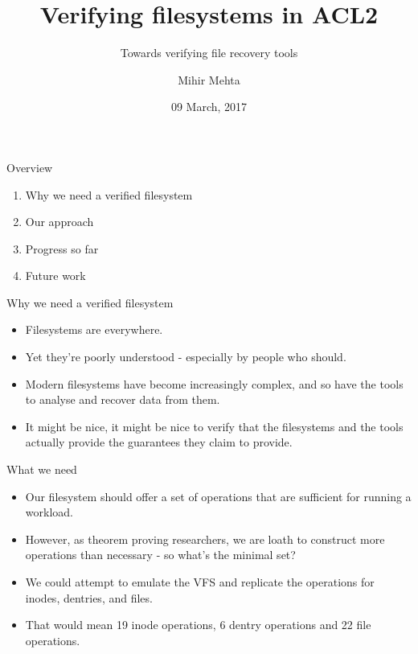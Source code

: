 \documentclass{beamer}
\title{Verifying filesystems in ACL2}
\subtitle{Towards verifying file recovery tools}
\author{Mihir Mehta}
\institute{
  Department of Computer Science\\
  University of Texas at Austin\\[1ex]
  \texttt{mihir@cs.utexas.edu}
}
\date{09 March, 2017}
\begin{document}
\begin{frame}[plain]
  \titlepage
\end{frame}

\begin{frame}{Overview}
  \begin{enumerate}
  \item Why we need a verified filesystem
  \item Our approach
  \item Progress so far
  \item Future work
  \end{enumerate}
\end{frame}

\begin{frame}{Why we need a verified filesystem}
  \begin{itemize}
  \item Filesystems are everywhere.
  \item Yet they're poorly understood - especially by people who
    should.
  \item Modern filesystems have become increasingly complex, and so
    have the tools to analyse and recover data from them.
  \item It might be nice, it might be nice to verify that the
    filesystems and the tools actually provide the guarantees they
    claim to provide.
  \end{itemize}
\end{frame}

\begin{frame}{What we need}
  \begin{itemize}
    \item Our filesystem should offer a set of operations that are
      sufficient for running a workload.
    \item However, as theorem proving researchers, we are loath to
      construct more operations than necessary - so what's the minimal
      set?
    \item We could attempt to emulate the VFS and replicate the
      operations for inodes, dentries, and files.
    \item That would
      mean 19 inode operations, 6 dentry operations and 22 file operations.
  \end{itemize}
\end{frame}
\end{document}
